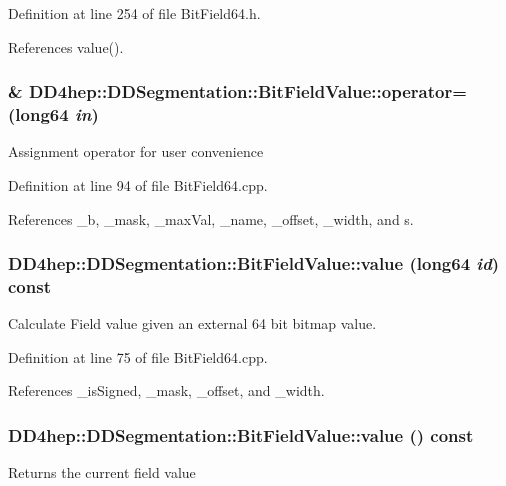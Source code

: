 Definition at line 254 of file BitField64.h.

References value().\hypertarget{class_d_d4hep_1_1_d_d_segmentation_1_1_bit_field_value_a0d388c5d7d243d80da663a23b420cfde}{
\subsubsection[{operator=}]{ \& DD4hep::DDSegmentation::BitFieldValue::operator= ({\bf long64} {\em in})}}
\label{class_d_d4hep_1_1_d_d_segmentation_1_1_bit_field_value_a0d388c5d7d243d80da663a23b420cfde}
Assignment operator for user convenience 

Definition at line 94 of file BitField64.cpp.

References \_\-b, \_\-mask, \_\-maxVal, \_\-name, \_\-offset, \_\-width, and s.\hypertarget{class_d_d4hep_1_1_d_d_segmentation_1_1_bit_field_value_ad25df427deb9fb0bc4fc61b5592db1cd}{
\subsubsection[{value}]{ DD4hep::DDSegmentation::BitFieldValue::value ({\bf long64} {\em id}) const}}
\label{class_d_d4hep_1_1_d_d_segmentation_1_1_bit_field_value_ad25df427deb9fb0bc4fc61b5592db1cd}


Calculate Field value given an external 64 bit bitmap value. 

Definition at line 75 of file BitField64.cpp.

References \_\-isSigned, \_\-mask, \_\-offset, and \_\-width.\hypertarget{class_d_d4hep_1_1_d_d_segmentation_1_1_bit_field_value_a5d269226e9aec30a8377f9a64bb5ff35}{
\subsubsection[{value}]{ DD4hep::DDSegmentation::BitFieldValue::value () const}}
\label{class_d_d4hep_1_1_d_d_segmentation_1_1_bit_field_value_a5d269226e9aec30a8377f9a64bb5ff35}
Returns the current field value 

